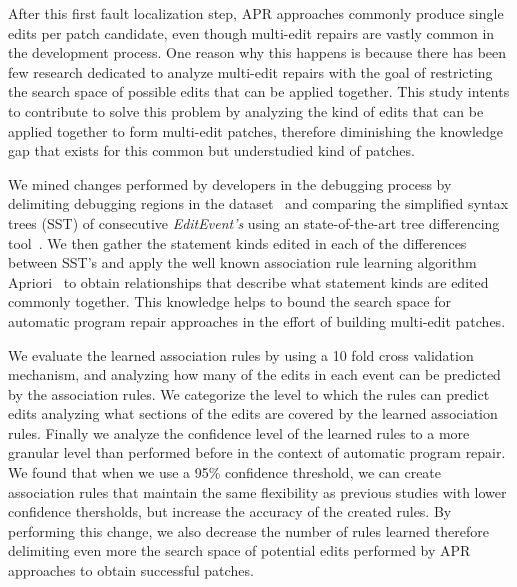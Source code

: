 \documentclass[sigconf]{acmart}
\begin{document}
After this first fault localization step, APR approaches 
commonly produce single edits per patch
candidate, even though multi-edit repairs are vastly common in the 
development process. One reason why this happens is because
there has been few research dedicated to analyze multi-edit
repairs with the goal of restricting the search space of possible edits that 
can be applied together. This study intents to contribute to
solve this problem by analyzing  
the kind of edits that can be applied together to form
multi-edit patches, therefore diminishing the knowledge
gap that exists for this common but understudied kind of patches.

We mined changes performed by developers in the debugging
process by delimiting debugging regions in the dataset~\cite{msr18challenge} and comparing the simplified syntax
trees (SST) of consecutive \textit{EditEvent's} using an 
state-of-the-art tree differencing tool~\cite{Pawlik16Apted}.
We then gather the statement kinds edited in each of the 
differences between SST's and apply the well known association
rule learning algorithm Apriori~\cite{Agrawal94}
to obtain relationships that describe what statement kinds
are edited commonly together. This knowledge helps to 
bound the search space for automatic program repair approaches
in the effort of building multi-edit patches.

We evaluate the learned association rules by using a 10 fold
cross validation mechanism, and analyzing how many of the edits
in each event can be predicted by the association rules.
We categorize the level to which the rules can predict edits
analyzing what sections of the edits are covered by the 
learned association rules. Finally we analyze
the confidence level of the learned rules to a more granular 
level than performed before in the context of automatic
program repair. We found that when we use a 95\% confidence
threshold, we can create association
rules that maintain the same flexibility as previous
studies with lower confidence thersholds, but increase
the accuracy of the created rules.
By performing this change, we also
decrease the number of rules learned therefore
delimiting even more the search space of potential edits
performed by APR approaches to obtain successful patches.
\end{document}

